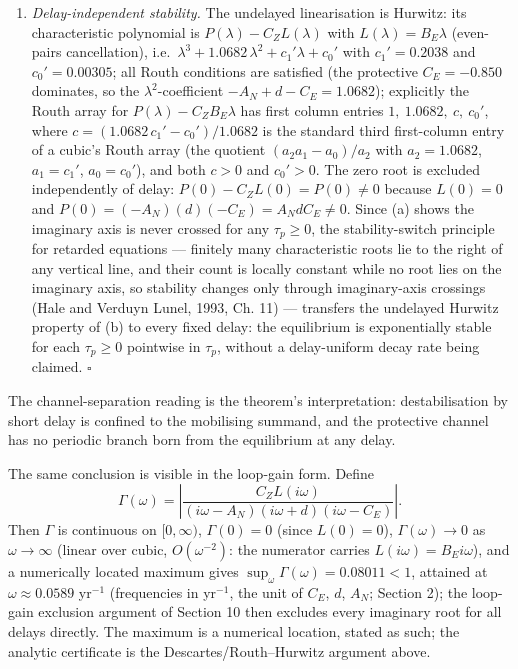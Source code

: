 \documentclass[11pt]{article}
\providecommand{\tightlist}{\setlength{\itemsep}{0pt}\setlength{\parskip}{0pt}}
\begin{document}
\begin{enumerate}
\def\labelenumi{(\alph{enumi})}
\setcounter{enumi}{1}
\tightlist
\item
  \emph{Delay-independent stability.} The undelayed linearisation is
  Hurwitz: its characteristic polynomial is
  \(P(\lambda) - C_Z L(\lambda)\) with \(L(\lambda) = B_E\lambda\)
  (even-pairs cancellation),
  i.e.~\(\lambda^3 + 1.0682\,\lambda^2 + c_1'\lambda + c_0'\) with
  \(c_1' = 0.2038\) and \(c_0' = 0.00305\); all Routh conditions are
  satisfied (the protective \(C_E = -0.850\) dominates, so the
  \(\lambda^2\)-coefficient \(-A_N + d - C_E = 1.0682\)); explicitly the
  Routh array for \(P(\lambda) - C_Z B_E\lambda\) has first column
  entries \(1,\ 1.0682,\ c,\ c_0'\), where
  \(c = (1.0682\,c_1' - c_0')/1.0682\) is the standard third
  first-column entry of a cubic's Routh array (the quotient
  \((a_2a_1 - a_0)/a_2\) with \(a_2 = 1.0682\), \(a_1 = c_1'\),
  \(a_0 = c_0'\)), and both \(c > 0\) and \(c_0' > 0\). The zero root is
  excluded independently of delay: \(P(0) - C_Z L(0) = P(0) \ne 0\)
  because \(L(0) = 0\) and \(P(0) = (-A_N)(d)(-C_E) = A_N d C_E \ne 0\).
  Since (a) shows the imaginary axis is never crossed for any
  \(\tau_p \ge 0\), the stability-switch principle for retarded
  equations --- finitely many characteristic roots lie to the right of
  any vertical line, and their count is locally constant while no root
  lies on the imaginary axis, so stability changes only through
  imaginary-axis crossings (Hale and Verduyn Lunel, 1993, Ch. 11) ---
  transfers the undelayed Hurwitz property of (b) to every fixed delay:
  the equilibrium is exponentially stable for each \(\tau_p \ge 0\)
  pointwise in \(\tau_p\), without a delay-uniform decay rate being
  claimed. \ensuremath{\square}
\end{enumerate}

The channel-separation reading is the theorem's interpretation:
destabilisation by short delay is confined to the mobilising summand,
and the protective channel has no periodic branch born from the
equilibrium at any delay.

The same conclusion is visible in the loop-gain form. Define
\[\Gamma(\omega) = \left| \frac{C_Z L(i\omega)}{(i\omega - A_N)(i\omega + d)(i\omega - C_E)} \right|.\]
Then \(\Gamma\) is continuous on \([0,\infty)\), \(\Gamma(0) = 0\)
(since \(L(0) = 0\)), \(\Gamma(\omega) \to 0\) as \(\omega \to \infty\)
(linear over cubic, \(O(\omega^{-2})\): the numerator carries
\(L(i\omega) = B_E i\omega\)), and a numerically located maximum gives
\(\sup_\omega \Gamma(\omega) = 0.08011 < 1\), attained at
\(\omega \approx 0.0589\) yr\(^{-1}\) (frequencies in yr\(^{-1}\), the
unit of \(C_E\), \(d\), \(A_N\); Section 2); the loop-gain exclusion
argument of Section 10 then excludes every imaginary root for all delays
directly. The maximum is a numerical location, stated as such; the
analytic certificate is the Descartes/Routh--Hurwitz argument above.
\end{document}
